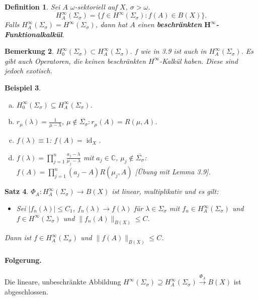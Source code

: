 \documentclass[12pt]{extreport} %
\newtheorem{Satz}{Satz}[subsection]
\newtheorem{Definition}[Satz]{Definition}
\newtheorem{Bemerkung}[Satz]{Bemerkung}
\newtheorem{Beispiel}[Satz]{Beispiel}
\DeclareMathOperator{\id}{id}
\numberwithin{equation}{section}
\newcommand{\C}{\mathbb{C}} %
\newcommand{\om}{\omega}
\begin{document}
	 \begin{Definition}
	 	Sei $A$ $\om$-sektoriell auf $X$, $\sigma > \om$. 
	 	$$H_A^\infty(\Sigma_\sigma) = \{f\in H^\infty(\Sigma_\sigma)\colon f(A) \in B(X) \}.$$
	 	Falls $H_A^\infty(\Sigma_\sigma) = H^\infty(\Sigma_\sigma)$, dann hat $A$ einen \textbf{beschränkten} $\mathbf{H^\infty}$\textbf{-Funktionalkalkül}.
	 \end{Definition}
	
	\begin{Bemerkung}
		$H_0^\infty(\Sigma_\sigma)\subset H_A^\infty(\Sigma_\sigma)$. $f$ wie in 3.9 ist auch in $H_A^\infty(\Sigma_\sigma)$. Es gibt auch Operatoren, die keinen beschränkten $H^\infty$-Kalkül haben. Diese sind jedoch exotisch.
	\end{Bemerkung}
	
	\begin{Beispiel}
		~
		\begin{enumerate}[a)]
			\item $H_0^\infty(\Sigma_\sigma) \subseteq H_A^\infty(\Sigma_\sigma)$.
			\item $r_\mu(\lambda) = \frac{1}{\mu-\lambda}$, $\mu\notin \overline{\Sigma_\sigma}\colon r_\mu(A) = R(\mu, A)$.\\
			\item $f(\lambda)\equiv 1$: $f(A) = \id_X$.
			\item $f(\lambda) = \prod_{j = 1}^n \frac{a_j-\lambda}{\mu_j-\lambda}$  mit $a_j \in \C$, $\mu_j\notin \overline{\Sigma_\sigma}$: $f(A) = \prod_{j = 1}^{ n }(a_j- A) R(\mu_j, A)$ [Übung mit Lemma 3.9].
		\end{enumerate}
	\end{Beispiel}
	
	\begin{Satz}
		$\Phi_A\colon H_A^\infty(\Sigma_\sigma) \rightarrow B(X)$ ist linear, multiplikativ und es gilt: 
		\begin{itemize}
			\item[$(+)$] Sei $|f_n(\lambda)|\leq C_1$, $f_n(\lambda)\rightarrow f(\lambda)$ für $\lambda\in \Sigma_\sigma$ mit $f_n\in H_A^\infty(\Sigma_\sigma)$ und $f\in H^\infty(\Sigma_\sigma)$ und $\|f_n(A)\|_{B(X)}\leq C$.
		\end{itemize}
		Dann ist $f\in H_A^\infty(\Sigma_\sigma)$ und $\|f(A)\|_{B(X)}\leq C$.
	\end{Satz}
	
	\paragraph{Folgerung.} Die lineare, unbeschränkte Abbildung $H^\infty(\Sigma_\sigma)\supseteq H_A^\infty(\Sigma_\sigma)\overset{\Phi_A}{\rightarrow} B(X)$ ist abgeschlossen.
	
\end{document}
